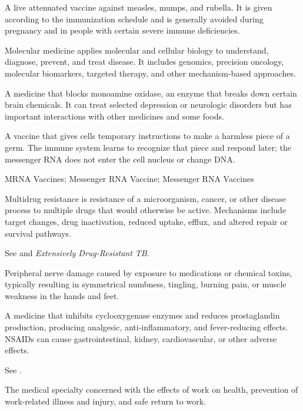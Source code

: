  A live attenuated vaccine against measles, mumps, and rubella. It is given according to the
immunization schedule and is generally avoided during pregnancy and in people with certain severe immune deficiencies.

 Molecular medicine applies molecular and cellular biology to understand, diagnose, prevent, and treat disease. It includes genomics, precision oncology, molecular biomarkers, targeted therapy, and other mechanism-based approaches.

 A medicine that blocks monoamine oxidase, an enzyme that breaks down certain brain chemicals. It can treat selected depression or neurologic disorders but has important interactions with other medicines and some foods.

 A vaccine that gives cells temporary instructions to make a harmless piece of a germ. The immune system learns to recognize that piece and respond later; the messenger RNA does not enter the cell nucleus or change DNA.

\synonyms
MRNA Vaccines; Messenger RNA Vaccine; Messenger RNA Vaccines

 Multidrug resistance is resistance of a microorganism, cancer, or other disease process to multiple drugs that would otherwise be active. Mechanisms include target changes, drug inactivation, reduced uptake, efflux, and altered repair or survival pathways.

 See  and \textit{Extensively Drug-Resistant TB}.

 Peripheral nerve damage caused by exposure to medications or chemical toxins, typically resulting in symmetrical numbness, tingling, burning pain, or muscle weakness in the hands and feet.

 A medicine that inhibits cyclooxygenase enzymes and reduces prostaglandin production, producing analgesic,
anti-inflammatory, and fever-reducing effects. NSAIDs can cause gastrointestinal,
kidney, cardiovascular, or other adverse effects.

 See .


 The medical specialty concerned with the effects of work on health, prevention of work-related illness and injury, and safe return
to work.

